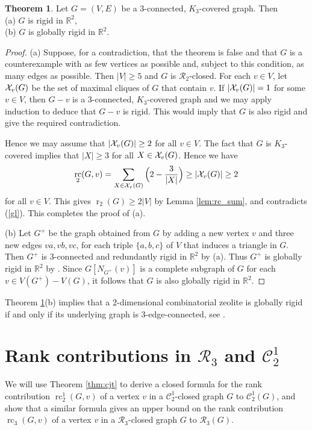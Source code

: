 \documentclass[11pt,a4paper]{article}
\theoremstyle{definition}
\newtheorem{theorem}{Theorem}[section]
\DeclareMathOperator{\rr}{r}
\DeclareMathOperator{\rc}{rc}
\newcommand{\cR}{\mathcal{R}}
\newcommand{\R}{\mathbb{R}}
\newcommand{\cC}{\mathcal{C}}
\begin{document}
\begin{theorem}
\label{K3}
Let $G=(V,E)$ be a 3-connected, $K_3$-covered graph. Then\\
(a) $G$ is rigid in $\R^2$,\\
(b) $G$ is globally rigid in $\R^2$.
\end{theorem}

\begin{proof}
(a) Suppose, for a contradiction, that the theorem is false and that $G$ is a counterexample with as few vertices as possible and, subject to this condition, as many edges as possible. Then
$|V|\geq 5$ and
$G$ is $\cR_2$-closed. For each $v\in V$, let ${\cal X}_v(G)$ be the set of maximal cliques of $G$ that contain  $v$.
If  $|{\cal X}_v(G)|=1$ for some $v\in V$,
then $G-v$ is a 3-connected, $K_3$-covered graph and we may apply  induction to deduce that $G-v$ is rigid. This would imply that  $G$ is also rigid and give the required contradiction.

Hence we may assume that $|{\cal X}_v(G)|\geq 2$ for all $v\in V$. 
The fact that $G$ is $K_3$-covered implies that $|X|\geq 3$ for all $X\in {\cal X}_v(G)$.
Hence we have
$$\rc_2(G,v)=\sum_{X\in \mathcal{X}_v(G)}\Big(2-\frac{3}{|X|}\Big)\geq |{\cal X}_v(G)|\geq 2$$
for all $v\in V$. This gives $\rr_2(G)\geq 2|V|$ by Lemma \ref{lem:rc_sum},
and contradicts (\ref{gl}). This completes the proof of (a).

(b)
Let $G^+$ be the graph obtained from $G$ by adding a new vertex $v$ and three new edges $va,vb,vc$, for each triple $\{a,b,c\}$ of $V$ that induces a triangle in $G$. Then $G^+$ is $3$-connected and redundantly rigid in $\R^2$
by (a). Thus $G^+$ is globally rigid in $\R^2$ by \cite{JJconnrig}. 
Since $G[N_{G^+}(v)]$ is
a complete subgraph of $G$ for
each $v\in V(G^+)-V(G)$, it follows that $G$ is also globally rigid in $\R^2$.
\end{proof}



Theorem \ref{K3}(b) implies that a 2-dimensional combinatorial zeolite is globally rigid if and only if its
underlying graph is 3-edge-connected, see \cite[Corollary 3.4]{Jzeo}.


\section{Rank contributions in $\mathcal{R}_3$ and $\mathcal{C}_2^1$ }


We will use Theorem \ref{thm:cjt} to derive a closed formula for the rank contribution $\rc_2^1(G,v)$ of a vertex $v$ in a $\mathcal{C}_2^1$-closed graph $G$ to $\cC_2^1(G)$, and show that a similar formula gives an upper bound on the rank contribution $\rc_3(G,v)$ of a vertex $v$ in a $\mathcal{R}_3$-closed graph $G$ to $\cR_3(G)$.
\end{document}
